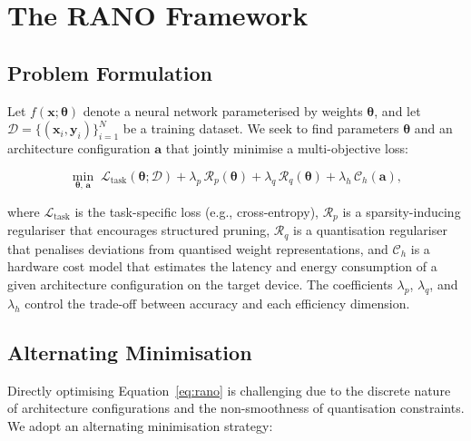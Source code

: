 \section{The RANO Framework}

\subsection{Problem Formulation}

Let $f(\mathbf{x}; \boldsymbol{\theta})$ denote a neural network
parameterised by weights $\boldsymbol{\theta}$, and let
$\mathcal{D} = \{(\mathbf{x}_i, \mathbf{y}_i)\}_{i=1}^{N}$ be a
training dataset. We seek to find parameters $\boldsymbol{\theta}$ and
an architecture configuration $\mathbf{a}$ that jointly minimise a
multi-objective loss:

\begin{equation}
\min_{\boldsymbol{\theta},\,\mathbf{a}} \;
\mathcal{L}_{\text{task}}(\boldsymbol{\theta}; \mathcal{D})
+ \lambda_p \, \mathcal{R}_p(\boldsymbol{\theta})
+ \lambda_q \, \mathcal{R}_q(\boldsymbol{\theta})
+ \lambda_h \, \mathcal{C}_h(\mathbf{a}),
\label{eq:rano}
\end{equation}

where $\mathcal{L}_{\text{task}}$ is the task-specific loss (e.g.,
cross-entropy), $\mathcal{R}_p$ is a sparsity-inducing regulariser that
encourages structured pruning, $\mathcal{R}_q$ is a quantisation
regulariser that penalises deviations from quantised weight
representations, and $\mathcal{C}_h$ is a hardware cost model that
estimates the latency and energy consumption of a given architecture
configuration on the target device. The coefficients $\lambda_p$,
$\lambda_q$, and $\lambda_h$ control the trade-off between accuracy and
each efficiency dimension.

\subsection{Alternating Minimisation}

Directly optimising Equation~\ref{eq:rano} is challenging due to the
discrete nature of architecture configurations and the non-smoothness of
quantisation constraints. We adopt an alternating minimisation strategy:

